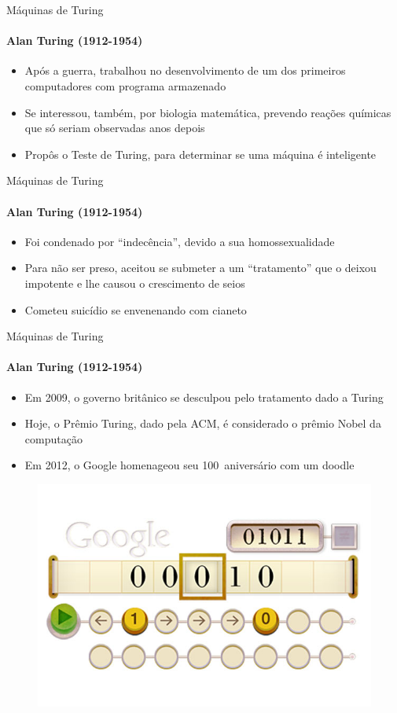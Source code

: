 \documentclass{beamer}
\begin{document}
\begin{frame}{Máquinas de Turing}
	\framesubtitle{Alan Turing (1912-1954)}
	\begin{itemize}
		\item Após a guerra, trabalhou no desenvolvimento de um dos primeiros computadores com programa armazenado
		\item Se interessou, também, por biologia matemática, prevendo reações químicas que só seriam observadas anos depois
		\item Propôs o \alert{Teste de Turing}, para determinar se uma máquina é inteligente
	\end{itemize}
\end{frame}
\begin{frame}{Máquinas de Turing}
	\framesubtitle{Alan Turing (1912-1954)}
	\begin{itemize}
		\item Foi condenado por ``indecência'', devido a sua homossexualidade
		\item Para não ser preso, aceitou se submeter a um ``tratamento'' que o deixou impotente e lhe causou o crescimento de seios
		\item Cometeu suicídio se envenenando com cianeto
	\end{itemize}
\end{frame}
\begin{frame}{Máquinas de Turing}
	\framesubtitle{Alan Turing (1912-1954)}
	\begin{itemize}
		\item Em 2009, o governo britânico se desculpou pelo tratamento dado a Turing
		\item Hoje, o Prêmio Turing, dado pela ACM, é considerado o prêmio Nobel da computação
		\item Em 2012, o Google homenageou seu 100\textordmasculine\ aniversário com um doodle
	\end{itemize}
	\begin{figure}
		\includegraphics[width=0.4\paperwidth]{resources/turing-doodle}
	\end{figure}
\end{frame}
\end{document}
